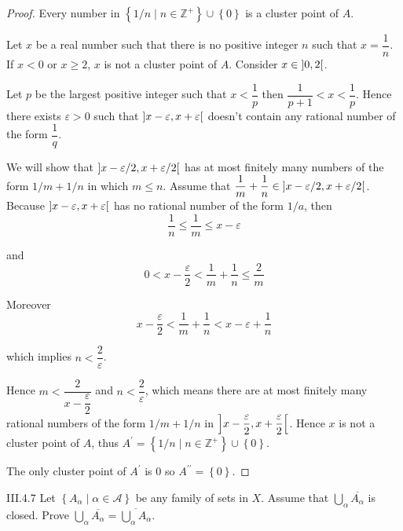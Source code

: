 \begin{proof}
    Every number in \( \left\{ 1/n \mid n \in \mathbb{Z}^{+} \right\} \cup \left\{0\right\} \) is a cluster point of \(A\).

    Let \(x\) be a real number such that there is no positive integer \(n\) such that \( x = \dfrac{1}{n} \). If \( x < 0 \) or \( x \ge 2 \), \( x \) is not a cluster point of \(A\). Consider \( x \in \left\rbrack{0, 2}\right\lbrack \).

    Let \(p\) be the largest positive integer such that \( x < \dfrac{1}{p} \) then \( \dfrac{1}{p+1} < x < \dfrac{1}{p} \). Hence there exists \( \varepsilon > 0 \) such that \( \left\rbrack{x - \varepsilon, x + \varepsilon}\right\lbrack \) doesn't contain any rational number of the form \( \dfrac{1}{q} \).

    We will show that \( \left\rbrack{x - \varepsilon/2, x + \varepsilon/2}\right\lbrack \) has at most finitely many numbers of the form \( 1/m + 1/n \) in which \( m \le n \). Assume that \( \dfrac{1}{m} + \dfrac{1}{n} \in \left\rbrack{x - \varepsilon/2, x + \varepsilon/2}\right\lbrack \). Because \( \left\rbrack{x - \varepsilon, x + \varepsilon}\right\lbrack \) has no rational number of the form \(1/a\), then
    \[ \dfrac{1}{n} \le \dfrac{1}{m} \le x - \varepsilon \]

    and
    \[ 0 < x - \dfrac{\varepsilon}{2} < \dfrac{1}{m} + \dfrac{1}{n} \le \dfrac{2}{m} \]

    Moreover
    \[
        x - \dfrac{\varepsilon}{2} < \dfrac{1}{m} + \dfrac{1}{n} < x - \varepsilon + \dfrac{1}{n}
    \]

    which implies \( n < \dfrac{2}{\varepsilon} \).

    Hence \( m < \dfrac{2}{x - \dfrac{\varepsilon}{2}} \) and \( n < \dfrac{2}{\varepsilon} \), which means there are at most finitely many rational numbers of the form \( 1/m + 1/n \) in \( \left\rbrack{x - \dfrac{\varepsilon}{2}, x + \dfrac{\varepsilon}{2}}\right\lbrack \). Hence \( x \) is not a cluster point of \(A\), thus \( A^{\prime} = \left\{ 1/n \mid n \in \mathbb{Z}^{+} \right\} \cup \left\{0\right\} \).

    The only cluster point of \(A^{\prime}\) is 0 so \( A^{\prime\prime} = \left\{0\right\} \).
\end{proof}

\begin{problem}{III.4.7}
Let \( \left\{ A_{\alpha} \mid \alpha \in \mathscr{A} \right\} \) be any family of sets in \(X\). Assume that \( \bigcup_{\alpha} \overline{A_{\alpha}} \) is closed. Prove \( \bigcup_{\alpha} \overline{A_{\alpha}} = \overline{\bigcup_{\alpha} A_{\alpha}} \).
\end{problem}

